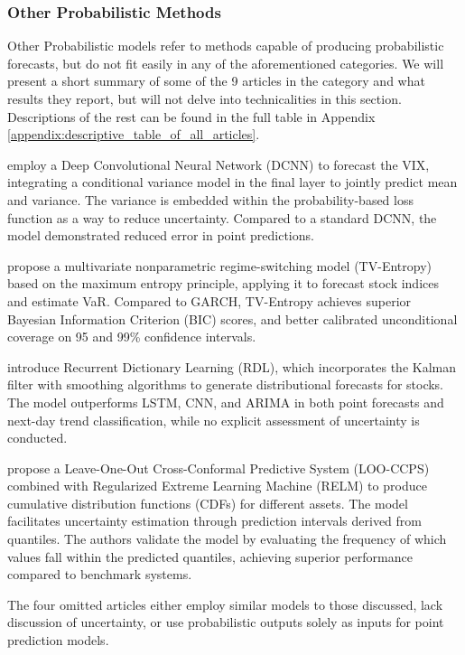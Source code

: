
\subsubsection{Other Probabilistic Methods}
Other Probabilistic models refer to methods capable of producing probabilistic forecasts, but do not fit easily in any of the aforementioned categories. We will present a short summary of some of the 9 articles in the category and what results they report, but will not delve into technicalities in this section. Descriptions of the rest can be found in the full table in Appendix \ref{appendix:descriptive_table_of_all_articles}. 

\textcite{Daniali2021} employ a Deep Convolutional Neural Network (DCNN) to forecast the VIX, integrating a conditional variance model in the final layer to jointly predict mean and variance. The variance is embedded within the probability-based loss function as a way to reduce uncertainty. Compared to a standard DCNN, the model demonstrated reduced error in point predictions. 

\textcite{Horenko2020} propose a multivariate nonparametric regime-switching model (TV-Entropy) based on the maximum entropy principle, applying it to forecast stock indices and estimate VaR. Compared to GARCH, TV-Entropy achieves superior Bayesian Information Criterion (BIC) scores, and better calibrated unconditional coverage on 95 and 99\% confidence intervals. 

\textcite{Sharma2021} introduce Recurrent Dictionary Learning (RDL), which incorporates the Kalman filter with smoothing algorithms to generate distributional forecasts for stocks. The model outperforms LSTM, CNN, and ARIMA in both point forecasts and next-day trend classification, while no explicit assessment of uncertainty is conducted.

\cite{wang2020fastconformal} propose a Leave-One-Out Cross-Conformal Predictive System (LOO-CCPS) combined with Regularized Extreme Learning Machine (RELM) to produce cumulative distribution functions (CDFs) for different assets. The model facilitates uncertainty estimation through prediction intervals derived from quantiles. The authors validate the model by evaluating the frequency of which values fall within the predicted quantiles, achieving superior performance compared to benchmark systems. 

The four omitted articles either employ similar models to those discussed, lack discussion of uncertainty, or use probabilistic outputs solely as inputs for point prediction models.





